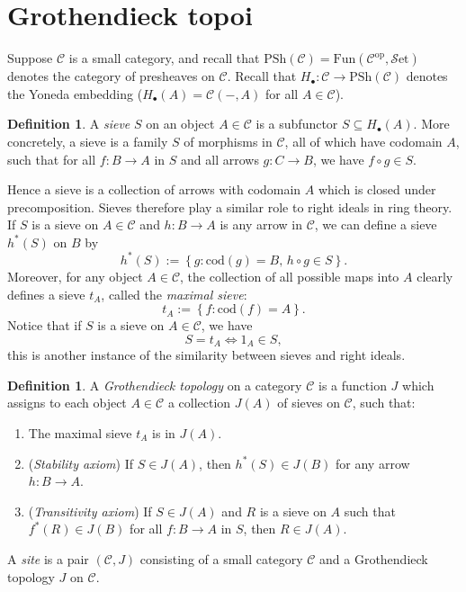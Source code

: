 \documentclass[10pt,oneside]{book}
\def\~#1{\mathscr{#1}}
\newcommand{\op}{\mathrm{op}}
\newcommand{\cod}{\mathrm{cod}}
\newcommand{\PSh}{\mathrm{PSh}}
\newcommand{\Fun}{\mathrm{Fun}}
\newcommand{\Set}{\~S\mathrm{et}}
\theoremstyle{plain}
\theoremstyle{definition}
\newtheorem{defn}[thm]{Definition}
\theoremstyle{remark}
\numberwithin{equation}{section}
\numberwithin{figure}{section}
\begin{document}
\section{Grothendieck topoi} Suppose $\~C$ is a small category, and recall that $\PSh(\~C) = \Fun(\~C^\op, \Set)$ denotes the category of presheaves on $\~C$. Recall that $H_\bullet: \~C \to \PSh(\~C)$ denotes the Yoneda embedding ($H_\bullet(A) = \~C(-, A)$ for all $A \in \~C$). 
\begin{defn}
    A \emph{sieve} $S$ on an object $A \in \~C$ is a subfunctor $S \subseteq H_\bullet(A)$. More concretely, a sieve is a family $S$ of morphisms in $\~C$, all of which have codomain $A$, such that for all $f: B \to A$ in $S$ and all arrows $g: C \to B$, we have $f \circ g \in S$. 
\end{defn}
Hence a sieve is a collection of arrows with codomain $A$ which is closed under precomposition. Sieves therefore play a similar role to right ideals in ring theory. If $S$ is a sieve on $A \in \~C$ and $h: B \to A$ is any arrow in $\~C$, we can define a sieve $h^\ast(S)$ on $B$ by 
\[h^\ast(S) := \left\{g : \cod(g) = B, \, h\circ g \in S \right\}.\]
Moreover, for any object $A \in \~C$, the collection of all possible maps into $A$ clearly defines a sieve $t_A$, called the \emph{maximal sieve}:
\[t_A := \left\{f : \cod(f) = A\right\}.\]
Notice that if $S$ is a sieve on $A \in \~C$, we have 
\[ S = t_A \iff 1_A \in S, \]
this is another instance of the similarity between sieves and right ideals.

\begin{defn}\label{defn:GT}
    A \emph{Grothendieck topology} on a category $\~C$ is a function $J$ which assigns to each object $A \in \~C$ a collection $J(A)$ of sieves on $\~C$, such that:
    \begin{enumerate}
        \item \label{GT:1} The maximal sieve $t_A$ is in $J(A)$. 
        \item \label{GT:2}(\emph{Stability axiom}) If $S \in J(A)$, then $h^\ast(S) \in J(B)$ for any arrow $h: B \to A$.   
        \item \label{GT:3}(\emph{Transitivity axiom}) If $S \in J(A)$ and $R$ is a sieve on $A$ such that $f^*(R) \in J(B)$ for all $f: B \to A$ in $S$, then $R \in J(A)$.
    \end{enumerate}
    A \emph{site} is a pair $(\~C, J)$ consisting of a small category $\~C$ and a Grothendieck topology $J$ on $\~C$.
\end{defn}
\end{document}
